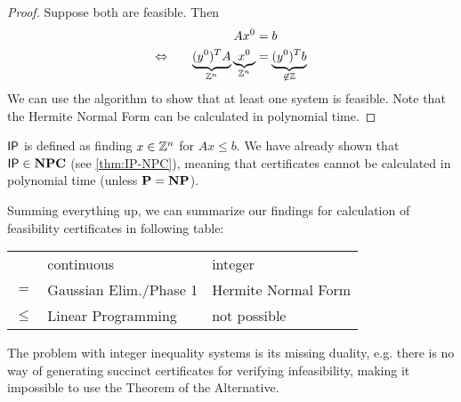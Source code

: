 \begin{proof}
    Suppose both are feasible. Then
    \begin{alignat*}{2}
                              &  & Ax^0                                                               & = b                                          \\
        \Leftrightarrow \quad &  & \underbrace{(y^0)^TA}_{\mathbb{Z}^n} \underbrace{x^0}_{\mathbb{Z}^n} & = \underbrace{(y^0)^Tb}_{\not \in \mathbb{Z}}
    \end{alignat*}
    We can use the  algorithm to show that at least one system is feasible.
    Note that the Hermite Normal Form can be calculated in polynomial time.
\end{proof}
\begin{problem}
$\mathsf{IP}$ is defined as finding $x \in \mathbb{Z}^n$ for $Ax \leq b$. We have already shown that $\mathsf{IP} \in \mathbf{NPC}$ (see \autoref{thm:IP-NPC}),
meaning that certificates cannot be calculated in polynomial time (unless $\mathbf{P} = \mathbf{NP}$).
\end{problem}
\begin{conclusion}
    Summing everything up, we can summarize our findings for calculation of feasibility certificates in following table:
    \begin{center}
        \begin{tabular}{rll}
                                        & continuous                                  & integer                                  \\ \cline{2-3}
            \multicolumn{1}{r|}{$=$}    & \multicolumn{1}{l|}{Gaussian Elim./Phase 1} & \multicolumn{1}{l|}{Hermite Normal Form} \\ \cline{2-3}
            \multicolumn{1}{r|}{$\leq$} & \multicolumn{1}{l|}{Linear Programming}     & \multicolumn{1}{l|}{not possible}        \\ \cline{2-3}
        \end{tabular}
    \end{center}

    The problem with integer inequality systems is its missing duality, e.g. there is no way of generating succinct certificates for verifying infeasibility, making
    it impossible to use the Theorem of the Alternative.
\end{conclusion}
